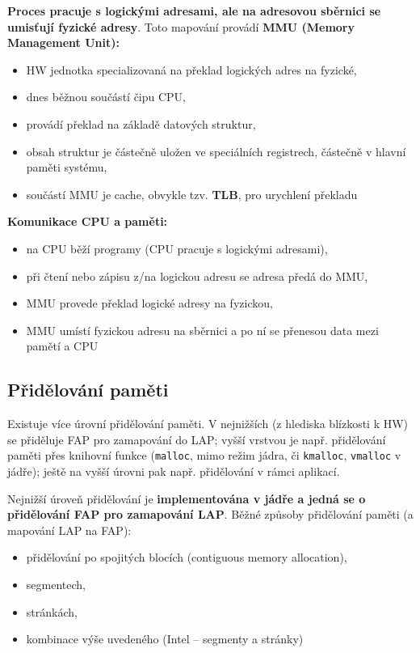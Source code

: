 \documentclass[a4paper, 11pt]{article}
\newcommand{\tcmd}[1]{\texttt{#1}}
\begin{document}
\textbf{Proces pracuje s logickými adresami, ale na adresovou sběrnici se umisťují fyzické adresy}. Toto mapování provádí \textbf{MMU (Memory Management Unit):}
\begin{itemize}
    \item HW jednotka specializovaná na překlad logických adres na fyzické, 
    \item dnes běžnou součástí čipu CPU,
    \item provádí překlad na základě datových struktur,
    \item obsah struktur je částečně uložen ve speciálních registrech, částečně v hlavní paměti systému,
    \item součástí MMU je cache, obvykle tzv. \textbf{TLB}, pro urychlení překladu
\end{itemize}
 
\textbf{Komunikace CPU a paměti:}
\begin{itemize}
    \item na CPU běží programy (CPU pracuje s logickými adresami),
    \item při čtení nebo zápisu z/na logickou adresu se adresa předá do MMU,
    \item MMU provede překlad logické adresy na fyzickou,
    \item MMU umístí fyzickou adresu na sběrnici a po ní se přenesou data mezi pamětí a CPU
\end{itemize}

\subsection{Přidělování paměti}
Existuje více úrovní přidělování paměti. V nejnižších (z hlediska blízkosti k HW) se přiděluje FAP pro zamapování do LAP; vyšší vrstvou je např. přidělování paměti přes knihovní funkce (\tcmd{malloc}, mimo režim jádra, či \tcmd{kmalloc}, \tcmd{vmalloc} v jádře); ještě na vyšší úrovni pak např. přidělování v rámci aplikací. 
 
Nejnižší úroveň přidělování je \textbf{implementována v jádře a jedná se o přidělování FAP pro zamapování LAP}. Běžné způsoby přidělování paměti (a mapování LAP na FAP):
\begin{itemize}
    \item přidělování po spojitých blocích (contiguous memory allocation),
    \item segmentech,
    \item stránkách,
    \item kombinace výše uvedeného (Intel -- segmenty a stránky)
\end{itemize}
 
\end{document}

